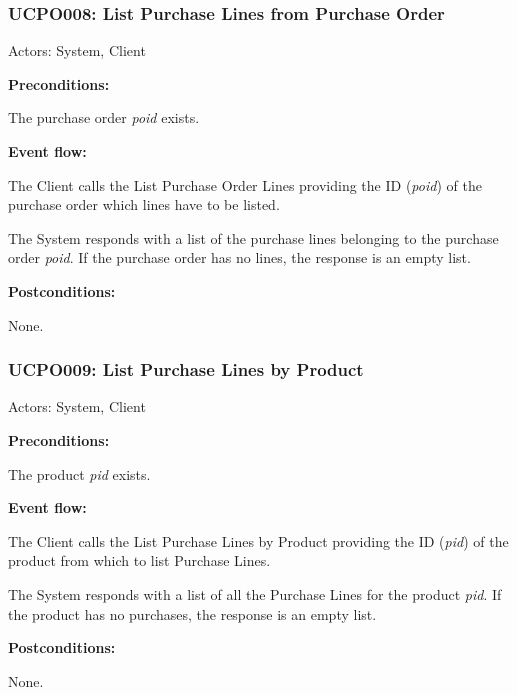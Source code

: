 \begin{ucbox}{\subsubsection{UCPO008: List Purchase Lines from Purchase Order}}
\label{UCPO008}

Actors: System, Client

\textbf{Preconditions:}

\ucitem The purchase order \textit{poid} exists.

\textbf{Event flow:}

\ucitem The Client calls the List Purchase Order Lines providing the ID (\textit{poid}) of the purchase order which lines have to be listed.

\ucitem The System responds with a list of the purchase lines belonging to the purchase order \textit{poid}. If the purchase order has no lines, the response is an empty list.

\textbf{Postconditions:}

\ucitem None.

\end{ucbox}

\begin{ucbox}{\subsubsection{UCPO009: List Purchase Lines by Product}}
\label{UCPO009}

Actors: System, Client

\textbf{Preconditions:}

\ucitem The product \textit{pid} exists.

\textbf{Event flow:}

\ucitem The Client calls the List Purchase Lines by Product providing the ID (\textit{pid}) of the product from which to list Purchase Lines.

\ucitem The System responds with a list of all the Purchase Lines for the product \textit{pid}. If the product has no purchases, the response is an empty list.

\textbf{Postconditions:}

\ucitem None.

\end{ucbox}

